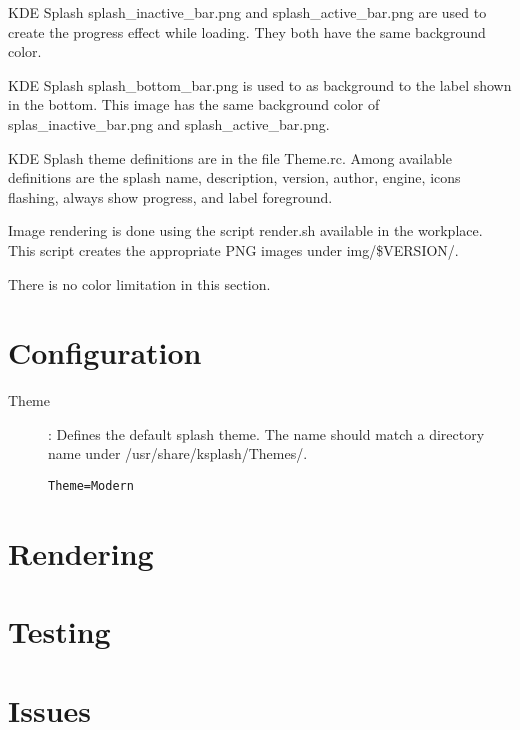 \documentclass{article}
\begin{document}
KDE Splash splash\_inactive\_bar.png and splash\_active\_bar.png are
used to create the progress effect while loading. They both have the
same background color.

KDE Splash splash\_bottom\_bar.png is used to as background to the
label shown in the bottom. This image has the same background color of
splas\_inactive\_bar.png and splash\_active\_bar.png.

KDE Splash theme definitions are in the file Theme.rc. Among available
definitions are the splash  name, description, version, author,
engine, icons flashing, always show progress, and label foreground.

Image rendering is done using the script render.sh available in the
workplace.  This script creates the appropriate PNG images under
img/\$VERSION/.

There is no color limitation in this section.

\section{Configuration}



\begin{description}

\item[Theme]: Defines the default splash theme. The name should match
a directory name under /usr/share/ksplash/Themes/.

\texttt{Theme=Modern}
\end{description}

\section{Rendering}
\section{Testing}
\section{Issues}


\end{document}
